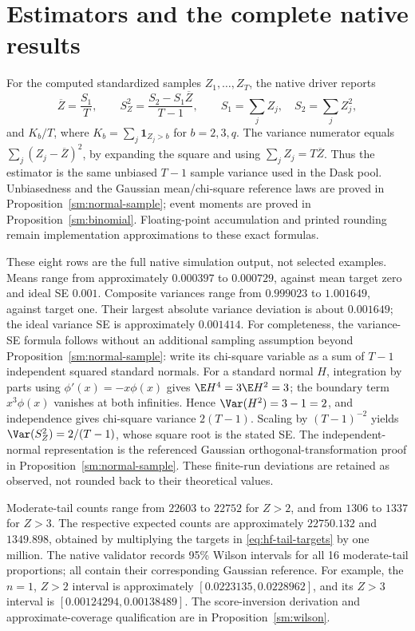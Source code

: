 \section{Estimators and the complete native results}
For the computed standardized samples \(Z_1,\ldots,Z_T\), the native
driver reports
\[
 \overline Z=\frac{S_1}{T},\qquad
 S_Z^2=\frac{S_2-S_1\overline Z}{T-1},\qquad
 S_1=\sum_j Z_j,\quad S_2=\sum_j Z_j^2,
\]
and \(K_b/T\), where \(K_b=\sum_j\mathbf1_{Z_j>b}\) for
\(b=2,3,q\). The variance numerator equals
\(\sum_j(Z_j-\overline Z)^2\), by expanding the square and using
\(\sum_jZ_j=T\overline Z\). Thus the estimator is the same unbiased
\(T-1\) sample variance used in the Dask pool. Unbiasedness and the
Gaussian mean/chi-square reference laws are proved in
Proposition~\ref{sm:normal-sample}; event moments are proved in
Proposition~\ref{sm:binomial}. Floating-point accumulation and printed
rounding remain implementation approximations to these exact formulas.

\begingroup\small

\endgroup
These eight rows are the full native simulation output, not selected
examples. Means range from approximately \(0.000397\) to \(0.000729\),
against mean target zero and ideal SE \(0.001\). Composite variances range
from \(0.999023\) to \(1.001649\), against target one. Their largest
absolute variance deviation is about \(0.001649\); the ideal variance
SE is approximately \(0.001414\). For completeness, the variance-SE
formula follows without an additional sampling assumption beyond
Proposition~\ref{sm:normal-sample}: write its chi-square variable as a sum
of \(T-1\) independent squared standard normals. For a standard normal
\(H\), integration by parts using \(\phi'(x)=-x\phi(x)\) gives
\(\E H^4=3\E H^2=3\); the boundary term
\(x^3\phi(x)\) vanishes at both infinities. Hence
\(\Var(H^2)=3-1=2\), and independence gives chi-square variance
\(2(T-1)\). Scaling by \((T-1)^{-2}\) yields
\(\Var(S_Z^2)=2/(T-1)\), whose square root is the stated SE.
The independent-normal representation is the referenced Gaussian
orthogonal-transformation proof in Proposition~\ref{sm:normal-sample}.
These finite-run deviations are retained
as observed, not rounded back to their theoretical values.

Moderate-tail counts range from \(22603\) to \(22752\) for \(Z>2\),
and from \(1306\) to \(1337\) for \(Z>3\). The respective expected
counts are approximately \(22750.132\) and \(1349.898\), obtained by
multiplying the targets in \eqref{eq:hf-tail-targets} by one million.
The native validator records 95\% Wilson intervals for all 16
moderate-tail proportions; all contain their corresponding Gaussian
reference. For example, the \(n=1\), \(Z>2\) interval is approximately
\([0.0223135,0.0228962]\), and its \(Z>3\) interval is
\([0.00124294,0.00138489]\). The score-inversion derivation and
approximate-coverage qualification are in Proposition~\ref{sm:wilson}.

